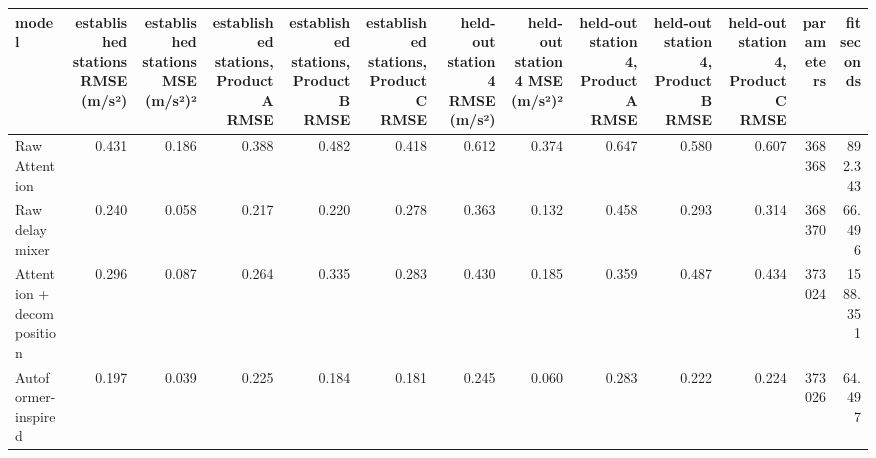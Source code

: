 \begin{tabular}{lrrrrrrrrrrrr}
\toprule
model & established stations RMSE (m/s²) & established stations MSE (m/s²)² & established stations, Product A RMSE & established stations, Product B RMSE & established stations, Product C RMSE & held-out station 4 RMSE (m/s²) & held-out station 4 MSE (m/s²)² & held-out station 4, Product A RMSE & held-out station 4, Product B RMSE & held-out station 4, Product C RMSE & parameters & fit seconds \\
\midrule
Raw Attention & 0.431 & 0.186 & 0.388 & 0.482 & 0.418 & 0.612 & 0.374 & 0.647 & 0.580 & 0.607 & 368368 & 892.343 \\
Raw delay mixer & 0.240 & 0.058 & 0.217 & 0.220 & 0.278 & 0.363 & 0.132 & 0.458 & 0.293 & 0.314 & 368370 & 66.496 \\
Attention + decomposition & 0.296 & 0.087 & 0.264 & 0.335 & 0.283 & 0.430 & 0.185 & 0.359 & 0.487 & 0.434 & 373024 & 1588.351 \\
Autoformer-inspired & 0.197 & 0.039 & 0.225 & 0.184 & 0.181 & 0.245 & 0.060 & 0.283 & 0.222 & 0.224 & 373026 & 64.497 \\
\bottomrule
\end{tabular}
